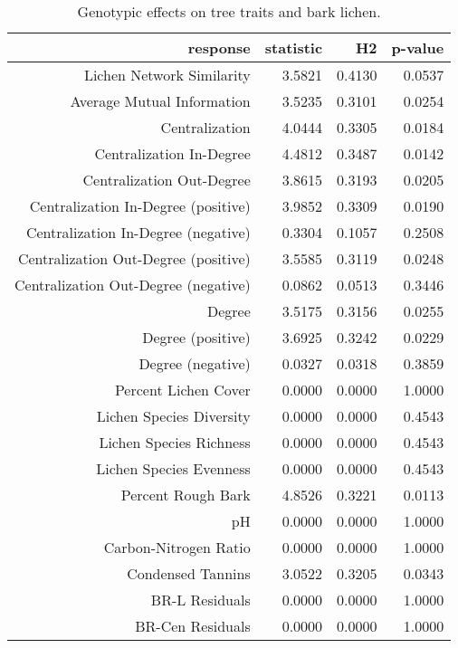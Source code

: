 \begin{table}[ht]
\centering
\begin{tabular}{rrrr}
  \hline
response & statistic & H2 & p-value \\ 
  \hline
Lichen Network Similarity & 3.5821 & 0.4130 & 0.0537 \\ 
  Average Mutual Information & 3.5235 & 0.3101 & 0.0254 \\ 
  Centralization & 4.0444 & 0.3305 & 0.0184 \\ 
  Centralization In-Degree & 4.4812 & 0.3487 & 0.0142 \\ 
  Centralization Out-Degree & 3.8615 & 0.3193 & 0.0205 \\ 
  Centralization In-Degree (positive) & 3.9852 & 0.3309 & 0.0190 \\ 
  Centralization In-Degree (negative) & 0.3304 & 0.1057 & 0.2508 \\ 
  Centralization Out-Degree (positive) & 3.5585 & 0.3119 & 0.0248 \\ 
  Centralization Out-Degree (negative) & 0.0862 & 0.0513 & 0.3446 \\ 
  Degree & 3.5175 & 0.3156 & 0.0255 \\ 
  Degree (positive) & 3.6925 & 0.3242 & 0.0229 \\ 
  Degree (negative) & 0.0327 & 0.0318 & 0.3859 \\ 
  Percent Lichen Cover & 0.0000 & 0.0000 & 1.0000 \\ 
  Lichen Species Diversity & 0.0000 & 0.0000 & 0.4543 \\ 
  Lichen Species Richness & 0.0000 & 0.0000 & 0.4543 \\ 
  Lichen Species Evenness & 0.0000 & 0.0000 & 0.4543 \\ 
  Percent Rough Bark & 4.8526 & 0.3221 & 0.0113 \\ 
  pH & 0.0000 & 0.0000 & 1.0000 \\ 
  Carbon-Nitrogen Ratio & 0.0000 & 0.0000 & 1.0000 \\ 
  Condensed Tannins & 3.0522 & 0.3205 & 0.0343 \\ 
  BR-L Residuals & 0.0000 & 0.0000 & 1.0000 \\ 
  BR-Cen Residuals & 0.0000 & 0.0000 & 1.0000 \\ 
   \hline
\end{tabular}
\caption{Genotypic effects on tree traits and bark lichen.} 
\label{tab:h2_table}
\end{table}

